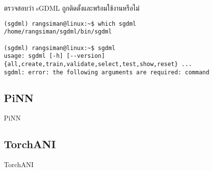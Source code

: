 \vspace{1em}
\noindent ตรวจสอบว่า sGDML ถูกติดตั้งและพร้อมใช้งานหรือไม่

\begin{lstlisting}[style=MyBash]
(sgdml) rangsiman@linux:~$ which sgdml
/home/rangsiman/sgdml/bin/sgdml

(sgdml) rangsiman@linux:~$ sgdml
usage: sgdml [-h] [--version] {all,create,train,validate,select,test,show,reset} ...
sgdml: error: the following arguments are required: command
\end{lstlisting}

\subsection{PiNN}
\label{ssec:lib_pinn}

PiNN\autocite{shao2020}

\subsection{TorchANI}
\label{ssec:lib_torchani}

TorchANI\autocite{gao2020}
